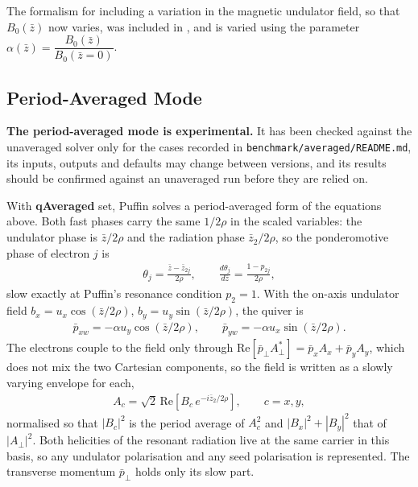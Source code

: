 \documentclass[12pt]{article}%
\begin{document}
The formalism for including a variation in the magnetic undulator field, so that $B_0(\bar{z})$ now varies, was included in \cite{2col}, and is varied using the parameter $\alpha(\bar{z}) = \dfrac{B_0(\bar{z})}{B_0(\bar{z}=0)}$.






\subsection{Period-Averaged Mode}

\label{puff-avg}

{\bf The period-averaged mode is experimental.} It has been checked against the unaveraged solver only for the cases recorded in {\tt benchmark/averaged/README.md}, its inputs, outputs and defaults may change between versions, and its results should be confirmed against an unaveraged run before they are relied on.

With {\bf qAveraged} set, Puffin solves a period-averaged form of the equations above. Both fast phases carry the same $1/2\rho$ in the scaled variables: the undulator phase is $\bar{z}/2\rho$ and the radiation phase $\bar{z}_2/2\rho$, so the ponderomotive phase of electron $j$ is
\begin{align}
\theta_j = \frac{\bar{z} - \bar{z}_{2j}}{2\rho}, \qquad \frac{d\theta_j}{d\bar{z}} = \frac{1 - p_{2j}}{2\rho},
\end{align}
slow exactly at Puffin's resonance condition $p_2 = 1$. With the on-axis undulator field $b_x = u_x \cos(\bar{z}/2\rho)$, $b_y = u_y \sin(\bar{z}/2\rho)$, the quiver is
\begin{align}
\bar{p}_{x w} = -\alpha u_y \cos(\bar{z}/2\rho), \qquad \bar{p}_{y w} = -\alpha u_x \sin(\bar{z}/2\rho).
\end{align}
The electrons couple to the field only through $\mathrm{Re}[\bar{p}_\bot A_\bot^*] = \bar{p}_x A_x + \bar{p}_y A_y$, which does not mix the two Cartesian components, so the field is written as a slowly varying envelope for each,
\begin{align}
A_c = \sqrt{2}\,\mathrm{Re}\left[B_c\, e^{-i\bar{z}_2/2\rho}\right], \qquad c = x, y,
\end{align}
normalised so that $|B_c|^2$ is the period average of $A_c^2$ and $|B_x|^2 + |B_y|^2$ that of $|A_\bot|^2$. Both helicities of the resonant radiation live at the same carrier in this basis, so any undulator polarisation and any seed polarisation is represented. The transverse momentum $\bar{p}_\bot$ holds only its slow part.
\end{document}
